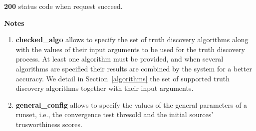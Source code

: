 \documentclass[a4paper,10pt]{scrartcl}
\begin{document}
\begin{enumerate}
\begin{description}
 \item \textbf{200} status code when request succeed.	
\end{description}
\textbf{Notes}
\begin{enumerate}
 \item \textbf{checked\_algo} allows to specify the set of truth discovery algorithms along with the values of their input arguments to be used for the truth discovery process. At least one algorithm must be provided, and when several algorithms
 are specified their results are combined by the system for a better accuracy. We detail in Section~\ref{algorithms} the set of supported truth discovery algorithms together with their input arguments.
\item \textbf{general\_config} allows to specify the values of the general parameters of a runset, i.e., the convergence test thresold and the initial sources' trusworthiness scores.
 \end{enumerate}
\end{enumerate}

\end{document}
